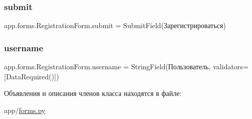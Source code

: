\subsubsection{\texorpdfstring{submit}{submit}}
{\footnotesize\ttfamily app.\+forms.\+Registration\+Form.\+submit = Submit\+Field(\textquotesingle{}Зарегистрироваться\textquotesingle{})\hspace{0.3cm}{\ttfamily [static]}}

\mbox{\label{classapp_1_1forms_1_1_registration_form_ac4f31c06a04cfadf0ecf269bcb65c29b}} 
\subsubsection{\texorpdfstring{username}{username}}
{\footnotesize\ttfamily app.\+forms.\+Registration\+Form.\+username = String\+Field(\textquotesingle{}Пользователь\textquotesingle{}, validators=\mbox{[}Data\+Required()\mbox{]})\hspace{0.3cm}{\ttfamily [static]}}



Объявления и описания членов класса находятся в файле\+:\begin{DoxyCompactItemize}
\item 
app/\mbox{\hyperlink{forms_8py}{forms.\+py}}\end{DoxyCompactItemize}

